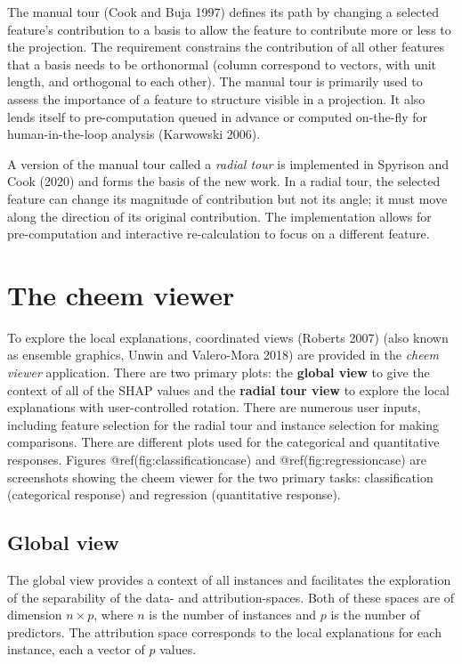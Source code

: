 \documentclass[
]{article}
\begin{document}
The manual tour (Cook and Buja 1997) defines its path by changing a
selected feature's contribution to a basis to allow the feature to
contribute more or less to the projection. The requirement constrains
the contribution of all other features that a basis needs to be
orthonormal (column correspond to vectors, with unit length, and
orthogonal to each other). The manual tour is primarily used to assess
the importance of a feature to structure visible in a projection. It
also lends itself to pre-computation queued in advance or computed
on-the-fly for human-in-the-loop analysis (Karwowski 2006).

A version of the manual tour called a \emph{radial tour} is implemented
in Spyrison and Cook (2020) and forms the basis of the new work. In a
radial tour, the selected feature can change its magnitude of
contribution but not its angle; it must move along the direction of its
original contribution. The implementation allows for pre-computation and
interactive re-calculation to focus on a different feature.

\hypertarget{sec:cheemviewer}{%
\section{The cheem viewer}\label{sec:cheemviewer}}

To explore the local explanations, coordinated views (Roberts 2007)
(also known as ensemble graphics, Unwin and Valero-Mora 2018) are
provided in the \emph{cheem viewer} application. There are two primary
plots: the \textbf{global view} to give the context of all of the SHAP
values and the \textbf{radial tour view} to explore the local
explanations with user-controlled rotation. There are numerous user
inputs, including feature selection for the radial tour and instance
selection for making comparisons. There are different plots used for the
categorical and quantitative responses. Figures
@ref(fig:classificationcase) and @ref(fig:regressioncase) are
screenshots showing the cheem viewer for the two primary tasks:
classification (categorical response) and regression (quantitative
response).

\hypertarget{global-view}{%
\subsection{Global view}\label{global-view}}

The global view provides a context of all instances and facilitates the
exploration of the separability of the data- and attribution-spaces.
Both of these spaces are of dimension \(n\times p\), where \(n\) is the
number of instances and \(p\) is the number of predictors. The
attribution space corresponds to the local explanations for each
instance, each a vector of \(p\) values.
\end{document}

